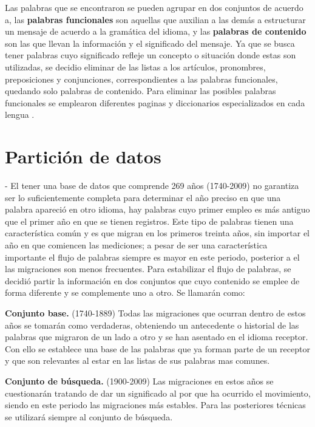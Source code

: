 

Las palabras que se encontraron se pueden agrupar en dos conjuntos de acuerdo a\cite{contenidopal}, las \textbf{palabras funcionales} son aquellas que auxilian a las demás a estructurar un mensaje de acuerdo a la gramática del idioma, y las \textbf{palabras de contenido} son las que llevan la información y el significado del mensaje. Ya  que se busca tener palabras cuyo significado refleje un concepto o situación donde estas son utilizadas, se decidio eliminar de las listas a los artículos, pronombres, preposiciones y conjunciones, correspondientes a las palabras funcionales, quedando solo palabras de contenido. Para eliminar las posibles palabras funcionales se emplearon diferentes paginas y diccionarios especializados en cada lengua \cite{englishdic, frenchdic, germandic, italiandic, spanishdic}. 




\section{Partición de datos} %

-
El tener una base de datos que comprende 269 años (1740-2009) no garantiza ser lo suficientemente completa para determinar el año preciso en que una palabra apareció en otro idioma, hay palabras cuyo primer empleo es más antiguo que el primer año en que se tienen registros. Este tipo de palabras tienen una característica común y es que migran en los primeros treinta años, sin importar el año en que comiencen las mediciones; a pesar de ser una característica importante el flujo de palabras siempre es mayor en este periodo, posterior a el las migraciones son menos frecuentes. Para estabilizar 
el flujo de palabras, se decidió partir la información en dos conjuntos que cuyo contenido se emplee de forma diferente y se complemente uno a otro.  Se llamarán como:


\textbf{Conjunto base.} (1740-1889) Todas las migraciones que ocurran dentro de estos años se tomarán como verdaderas, obteniendo un antecedente o historial de las palabras que migraron de un lado a otro y se han asentado en el idioma receptor. Con ello se establece una base de las palabras que ya forman parte de un receptor y que son relevantes al estar en las listas de sus palabras mas comunes. 

\textbf{Conjunto de búsqueda.} (1900-2009) Las migraciones en estos años se cuestionarán tratando de dar un significado al por que ha ocurrido el movimiento,  siendo en este periodo las migraciones más estables. Para las posteriores técnicas se utilizará siempre al conjunto de búsqueda.

